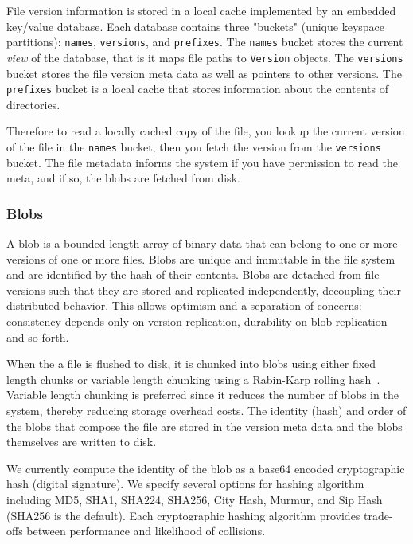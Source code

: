 \documentclass[letterpaper,twocolumn,10pt]{article}
\begin{document}
File version information is stored in a local cache implemented by an
embedded key/value database.
Each database contains three "buckets" (unique keyspace partitions):
\texttt{names}, \texttt{versions}, and \texttt{prefixes}.
The \texttt{names} bucket stores the current \textit{view} of the database,
that is it maps file paths to \texttt{Version} objects.
The \texttt{versions} bucket stores the file version meta data as well as
pointers to other versions.
The \texttt{prefixes} bucket is a local cache that stores information about
the contents of directories.

Therefore to read a locally cached copy of the file, you lookup the current
version of the file in the \texttt{names} bucket, then you fetch the version
from the \texttt{versions} bucket.
The file metadata informs the system if you have permission to read the meta,
and if so, the blobs are fetched from disk.

\subsubsection*{Blobs}

A blob is a bounded length array of binary data that can belong to one or more
versions of one or more files.
Blobs are unique and immutable in the file system and are identified by the
hash of their contents.
Blobs are detached from file versions such that they are stored and
replicated independently, decoupling their distributed behavior.
This allows optimism and a separation of concerns: consistency depends only
on version replication, durability on blob replication and so forth.

When the a file is flushed to disk, it is chunked into blobs using either
fixed length chunks or variable length chunking using a Rabin-Karp rolling
hash~\cite{karp_efficient_1987}.
Variable length chunking is preferred since it reduces the number of blobs in
the system, thereby reducing storage overhead costs.
The identity (hash) and order of the blobs that compose the file are stored
in the version meta data and the blobs themselves are written to disk.

We currently compute the identity of the blob as a base64 encoded
cryptographic hash (digital signature).
We specify several options for hashing algorithm including MD5, SHA1, SHA224,
SHA256, City Hash, Murmur, and Sip Hash (SHA256 is the default).
Each cryptographic hashing algorithm provides trade-offs between performance
and likelihood of collisions.
\end{document}
